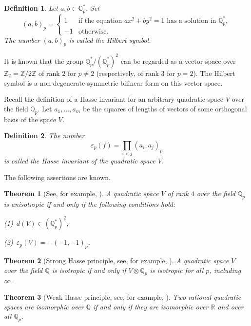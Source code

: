 \documentclass[reqno,12pt]{amsart}
\newtheorem{theorem}{\indent Theorem}%
\newtheorem{definition}{\indent Definition}%
\begin{document}
\begin{definition}
\label{d3.1}
Let $a, b \in \mathbb{Q}^*_p$. Set
$$
(a, b)_p =
\begin{cases}
1 & \text{if the equation } ax^2 + by^2 = 1 \text{ has a solution in }\mathbb{Q}^*_p,
\\
-1 & \text{otherwise.}
\end{cases}
$$
The number $(a, b)_p $ is called the \textit{Hilbert symbol}.
\end{definition}

It is known that the group $ \mathbb{Q}^*_ p / (\mathbb{Q}^*_ p)^2$ can be
regarded as a vector space over $\mathbb{Z}_2 = \mathbb{Z} / 2 \mathbb{Z}$
of rank $2$  for $p \not = 2$
(respectively, of rank $3$ for $p = 2$).
The Hilbert symbol is a non-degenerate symmetric bilinear
form on this vector space.


Recall the definition of a Hasse invariant for an arbitrary quadratic
space $V$ over the field $\mathbb{Q}_p$. Let $a_1, \dots, a_m$ be the squares of lengths
of vectors of some orthogonal basis of the space $V$.

\begin{definition}
The number
$$
\varepsilon_p (f) = \prod_{i <j} (a_i, a_j)_p
$$
is called the Hasse invariant of the quadratic space $V$.
\end{definition}

The following assertions are known.

\begin{theorem}[{\rm See, for example, \cite[Lemma~2.6]{Kas78}}]
\label{t3.1}
A quadratic space $V$ of rank $4$ over the field $\mathbb{Q}_p$
is anisotropic if and only if the following conditions hold:

{\rm(1)}~$d(V) \in (\mathbb{Q}^*_p)^2$;

{\rm(2)}~$\varepsilon_p (V)=-(-1, -1)_p$.
\end{theorem}

\begin{theorem}[{\rm Strong Hasse principle, see, for example,
\cite[Theorem~1.1]{Kas78}}]
\label{t3.2}
A quadratic space $V$ over the field $\mathbb{Q}$ is isotropic if and only if
$V \otimes \mathbb{Q}_p$ is isotropic for all $p$, including $\infty$.
\end{theorem}

\begin{theorem}[{\rm Weak Hasse principle, see, for example,
\cite[Theorem~1.2]{Kas78}}]
\label{t3.3}
Two rational quadratic spaces are isomorphic over $\mathbb{Q}$ if and only if
they are  isomorphic over $\mathbb{R}$ and over all $\mathbb{Q}_p$.
\end{theorem}
\end{document}
